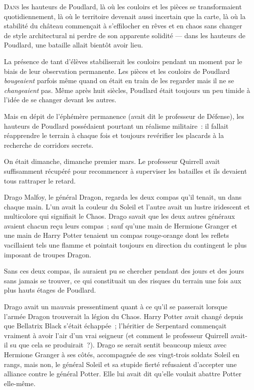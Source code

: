 
\lettrine{D}{ans} les hauteurs de Poudlard, là où les couloirs et les pièces se transformaient quotidiennement, là où le territoire devenait aussi incertain que la carte, là où la stabilité du château commençait à s'effilocher en rêves et en chaos sans changer de style architectural ni perdre de son apparente solidité — dans les hauteurs de Poudlard, une bataille allait bientôt avoir lieu.

La présence de tant d'élèves stabiliserait les couloirs pendant un moment par le biais de leur observation permanente. Les pièces et les couloirs de Poudlard \emph{bougeaient} parfois même quand on était en train de les regarder mais il ne se \emph{changeaient} pas. Même après huit siècles, Poudlard était toujours un peu timide à l'idée de se changer devant les autres.

Mais en dépit de l'éphémère permanence (avait dit le professeur de Défense), les hauteurs de Poudlard possédaient pourtant un réalisme militaire~: il fallait réapprendre le terrain à chaque fois et toujours revérifier les placards à la recherche de corridors secrets.

On était dimanche, dimanche premier mars. Le professeur Quirrell avait suffisamment récupéré pour recommencer à superviser les batailles et ils devaient tous rattraper le retard.

Drago Malfoy, le général Dragon, regarda les deux compas qu'il tenait, un dans chaque main. L'un avait la couleur du Soleil et l'autre avait un lustre iridescent et multicolore qui signifiait le Chaos. Drago savait que les deux autres généraux avaient chacun reçu leurs compas~; sauf qu'une main de Hermione Granger et une main de Harry Potter tenaient un compas rouge-orange dont les reflets vacillaient tels une flamme et pointait toujours en direction du contingent le plus imposant de troupes Dragon.

Sans ces deux compas, ils auraient pu se chercher pendant des jours et des jours sans jamais se trouver, ce qui constituait un des risques du terrain une fois aux plus hauts étages de Poudlard.

Drago avait un mauvais pressentiment quant à ce qu'il se passerait lorsque l'armée Dragon trouverait la légion du Chaos. Harry Potter avait changé depuis que Bellatrix Black s'était échappée~; l'héritier de Serpentard commençait vraiment à avoir l'air d'un vrai seigneur (et comment le professeur Quirrell avait-il su que cela se produirait~?). Drago se serait sentit beaucoup mieux avec Hermione Granger à ses côtés, accompagnée de ses vingt-trois soldats Soleil en rangs, mais non, le général Soleil et sa stupide fierté refusaient d'accepter une alliance contre le général Potter. Elle lui avait dit qu'elle voulait abattre Potter elle-même.

